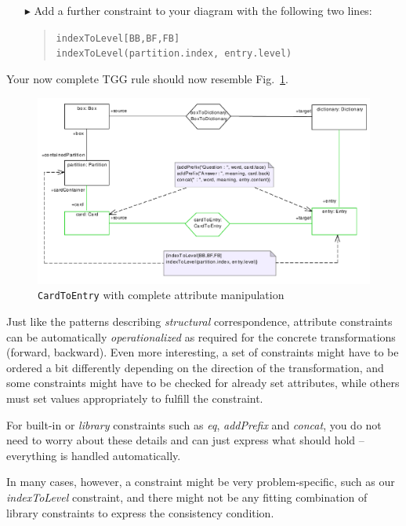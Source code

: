 \begin{enumerate}
\item[$\blacktriangleright$] Add a further constraint to your diagram with the following two lines:
\begin{quotation}
\noindent \texttt{indexToLevel[BB,BF,FB]}\\ 
\texttt{indexToLevel(partition.index, entry.level)} 
\end{quotation}
\end{enumerate}

Your now complete TGG rule should now resemble Fig.~\ref{fig:cardtoentry_complete}.
\begin{figure}[htbp]
\begin{center}
  \includegraphics[width=\textwidth]{pics/tggBilder/tggRule/tgg21}
  \caption{\texttt{CardToEntry} with complete attribute manipulation}  
  \label{fig:cardtoentry_complete}
\end{center}
\end{figure}

Just like the patterns describing \emph{structural} correspondence,  attribute constraints can be automatically \emph{operationalized} as required for the concrete transformations (forward, backward).
Even more interesting, a set of constraints might have to be ordered a bit differently depending on the direction of the transformation, and some constraints might have to be checked for already set attributes, while others must set values appropriately to fulfill the constraint.

For built-in or \emph{library} constraints such as \emph{eq}, \emph{addPrefix} and \emph{concat}, you do not need to worry about these details and can just express what should hold -- everything is handled automatically.

In many cases, however, a constraint might be very problem-specific, such as our \emph{indexToLevel} constraint, and there might not be any fitting combination of library constraints to express the consistency condition.

